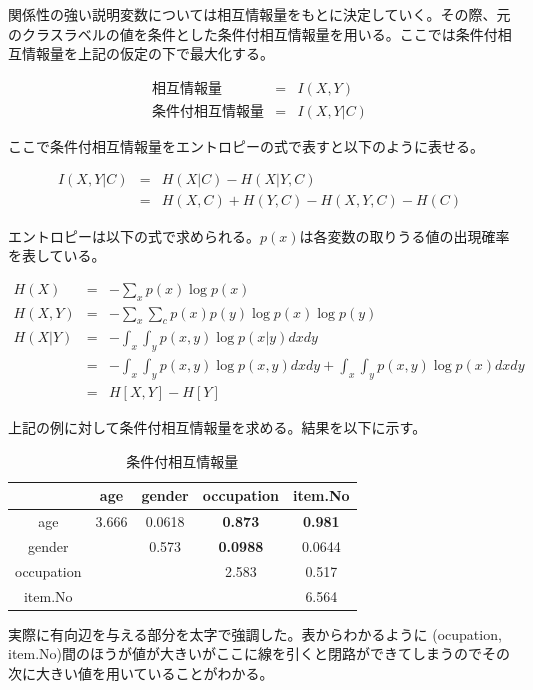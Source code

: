 \documentclass[a4j,12pt]{jarticle}
\begin{document}
関係性の強い説明変数については相互情報量をもとに決定していく。その際、元のクラスラベルの値を条件とした条件付相互情報量を用いる。ここでは条件付相互情報量を上記の仮定の下で最大化する。

\begin{eqnarray*}
\mbox{相互情報量} &=& I(X, Y) \\
\mbox{条件付相互情報量} &=& I(X, Y | C)
\end{eqnarray*}

ここで条件付相互情報量をエントロピーの式で表すと以下のように表せる。

\begin{eqnarray*}
I(X, Y | C) &=& H(X|C) - H(X|Y, C) \\
               &=& H(X, C) + H(Y, C) - H(X, Y, C) - H(C)
\end{eqnarray*}

エントロピーは以下の式で求められる。$p(x)$は各変数の取りうる値の出現確率を表している。

\begin{eqnarray*}
H(X) &=& - \sum_x p(x) \log p(x) \\
H(X, Y) &=& - \sum_x \sum_c p(x) p(y) \log p(x) \log p(y)　\\
H(X| Y) &=& - \int_x \int_y p(x, y) \log p(x| y) dx dy \\
           &=& - \int_x \int_y p(x, y) \log p(x, y) dx dy + \int_x \int_y p(x, y) \log p(x) dx dy \\
           &=& H[X, Y] - H[Y] 
\end{eqnarray*}

上記の例に対して条件付相互情報量を求める。結果を以下に示す。

\begin{table}[H]
\begin{center}
\caption{条件付相互情報量}
\begin{tabular}{|c||c|c|c|c|} \hline  
& age & gender & occupation & item.No \\ \hline \hline
age & 3.666 & 0.0618 & \bf{0.873} & \bf{0.981} \\
gender &  & 0.573 & \bf{0.0988} & 0.0644 \\
occupation &  &  & 2.583 & 0.517 \\
item.No &  &  &  & 6.564 \\ \hline
\end{tabular}
\end{center}
\end{table}

実際に有向辺を与える部分を太字で強調した。表からわかるように (ocupation, item.No)間のほうが値が大きいがここに線を引くと閉路ができてしまうのでその次に大きい値を用いていることがわかる。
\end{document}
